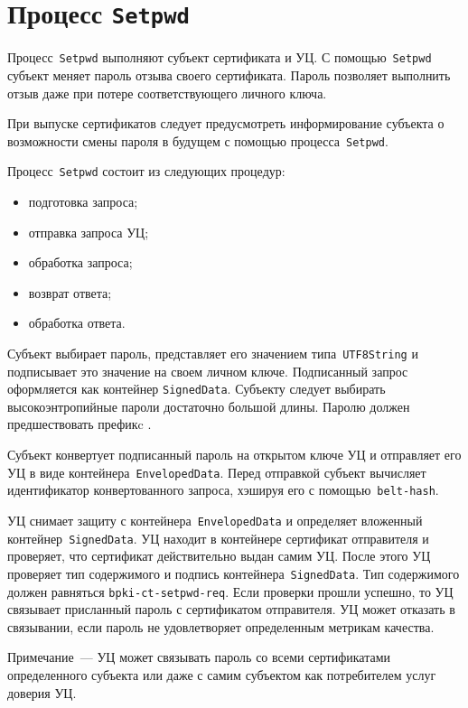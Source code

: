 \section{Процесс \texttt{Setpwd}}\label{PROCESSES.Setpwd}

Процесс~\texttt{Setpwd} выполняют субъект сертификата и УЦ.
С помощью~\texttt{Setpwd} субъект меняет пароль отзыва своего 
сертификата. Пароль позволяет выполнить отзыв даже при потере 
соответствующего личного ключа.

При выпуске сертификатов следует предусмотреть информирование субъекта 
о возможности смены пароля в будущем с помощью процесса~\texttt{Setpwd}.

Процесс~\texttt{Setpwd} состоит из следующих процедур:
\begin{itemize}
\item
подготовка запроса;
\item
отправка запроса УЦ;
\item
обработка запроса;
\item
возврат ответа;
\item
обработка ответа.
\end{itemize}

Субъект выбирает пароль, представляет его значением типа~\texttt{UTF8String}
и подписывает это значение на своем личном ключе.
Подписанный запрос оформляется как контейнер \texttt{SignedData}.
%
Субъекту следует выбирать высокоэнтропийные пароли достаточно большой 
длины. Паролю должен предшествовать префикc .

Субъект конвертует подписанный пароль на открытом ключе УЦ
и отправляет его УЦ в виде контейнера~\texttt{EnvelopedData}.
Перед отправкой субъект вычисляет идентификатор конвертованного запроса,
хэшируя его с помощью~\texttt{belt-hash}.

УЦ снимает защиту с контейнера~\texttt{EnvelopedData} и определяет 
вложенный контейнер~\texttt{SignedData}. УЦ находит в контейнере
сертификат отправителя и проверяет, что сертификат действительно 
выдан самим УЦ. После этого УЦ проверяет тип содержимого и подпись 
контейнера~\texttt{SignedData}. Тип содержимого должен равняться
\texttt{bpki-ct-setpwd-req}. Если проверки прошли успешно, то УЦ  
связывает присланный пароль с сертификатом отправителя. УЦ может отказать 
в связывании, если пароль не удовлетворяет определенным метрикам качества.

\begin{note}
Примечание~--- УЦ может связывать пароль со всеми сертификатами
определенного субъекта или даже с самим субъектом как потребителем услуг
доверия УЦ.
\end{note}

